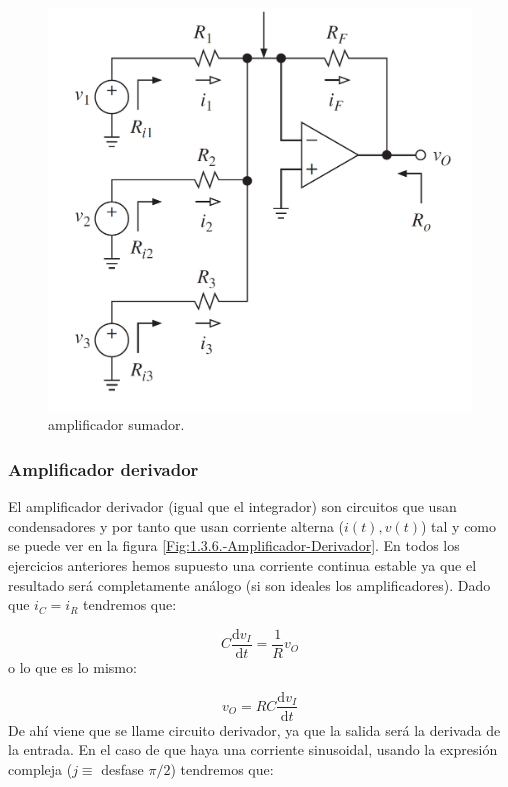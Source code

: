 \documentclass[11pt]{article} %
\newcommand{\D}{\mathrm{d}}
\begin{document}
\begin{figure}[h!] \centering
\includegraphics[scale=0.4]{1.5-Amplificador-sumador.png}
\caption{amplificador sumador.}
\label{Fig:1.3.5.-Amplificador-Sumador}
\end{figure} 

\subsubsection{Amplificador derivador}
El amplificador derivador (igual que el integrador) son circuitos que usan condensadores y por tanto que usan corriente alterna ($i(t),v(t)$) tal y como se puede ver en la figura \ref{Fig:1.3.6.-Amplificador-Derivador}. En todos los ejercicios anteriores hemos supuesto una corriente continua estable ya que el resultado será completamente análogo (si son ideales los amplificadores). Dado que $i_C=i_R$ tendremos que:

\begin{equation}
C \dfrac{\D v_I}{\D t} = \dfrac{1}{R}  v_O 
\end{equation}
o lo que es lo mismo:

\begin{equation}
v_O = RC \dfrac{\D v_I}{\D t}
\end{equation}
De ahí viene que se llame circuito derivador, ya que la salida será la derivada de la entrada. En el caso de que haya una corriente sinusoidal, usando la expresión compleja ($j \equiv $ desfase $\pi/2$) tendremos que:
\end{document}
